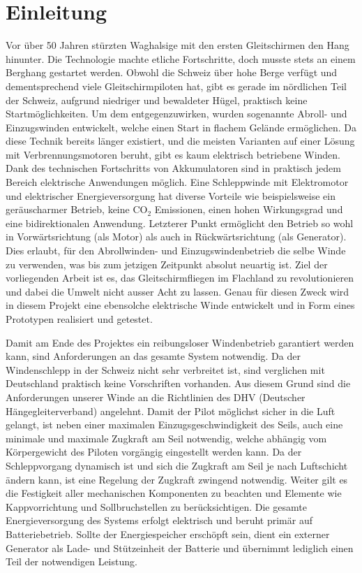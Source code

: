 \section{Einleitung}
Vor über 50 Jahren stürzten Waghalsige mit den ersten Gleitschirmen den Hang hinunter. Die Technologie machte etliche Fortschritte, doch musste stets an einem Berghang gestartet werden. Obwohl die Schweiz über hohe Berge verfügt und dementsprechend viele Gleitschirmpiloten hat, gibt es gerade im nördlichen Teil der Schweiz, aufgrund niedriger und bewaldeter Hügel, praktisch keine Startmöglichkeiten. Um dem entgegenzuwirken, wurden sogenannte Abroll- und Einzugswinden entwickelt, welche einen Start in flachem Gelände ermöglichen. Da diese Technik bereits länger existiert, und die meisten Varianten auf einer Lösung mit Verbrennungsmotoren beruht, gibt es kaum elektrisch betriebene Winden. Dank des technischen Fortschritts von Akkumulatoren sind in praktisch jedem Bereich elektrische Anwendungen möglich. Eine Schleppwinde mit Elektromotor und elektrischer Energieversorgung hat diverse Vorteile wie beispielsweise ein geräuscharmer Betrieb, keine CO$_{2}$ Emissionen, einen hohen Wirkungsgrad und eine bidirektionalen Anwendung. Letzterer Punkt ermöglicht den Betrieb so wohl in Vorwärtsrichtung (als Motor) als auch in Rückwärtsrichtung (als Generator). Dies erlaubt, für den Abrollwinden- und Einzugswindenbetrieb die selbe Winde zu verwenden, was bis zum jetzigen Zeitpunkt absolut neuartig ist. 
Ziel der vorliegenden Arbeit ist es, das Gleitschirmfliegen im Flachland zu revolutionieren und dabei die Umwelt nicht ausser Acht zu lassen. Genau für diesen Zweck wird in diesem Projekt eine ebensolche elektrische Winde entwickelt und in Form eines Prototypen realisiert und getestet.

Damit am Ende des Projektes ein reibungsloser Windenbetrieb garantiert werden kann, sind Anforderungen an das gesamte System notwendig. Da der Windenschlepp in der Schweiz nicht sehr verbreitet ist, sind verglichen mit Deutschland praktisch keine Vorschriften vorhanden. Aus diesem Grund sind die Anforderungen unserer Winde an die Richtlinien des DHV (Deutscher Hängegleiterverband) angelehnt.
Damit der Pilot möglichst sicher in die Luft gelangt, ist neben einer maximalen Einzugsgeschwindigkeit des Seils, auch eine minimale und maximale Zugkraft am Seil notwendig, welche abhängig vom Körpergewicht des Piloten vorgängig eingestellt werden kann. Da der Schleppvorgang dynamisch ist und sich die Zugkraft am Seil je nach Luftschicht ändern kann, ist eine Regelung der Zugkraft zwingend notwendig. Weiter gilt es die Festigkeit aller mechanischen Komponenten zu beachten und Elemente wie Kappvorrichtung und Sollbruchstellen zu berücksichtigen. Die gesamte Energieversorgung des Systems erfolgt elektrisch und beruht primär auf Batteriebetrieb. Sollte der Energiespeicher erschöpft sein, dient ein externer Generator als Lade- und Stützeinheit der Batterie und übernimmt lediglich einen Teil der notwendigen Leistung. 


